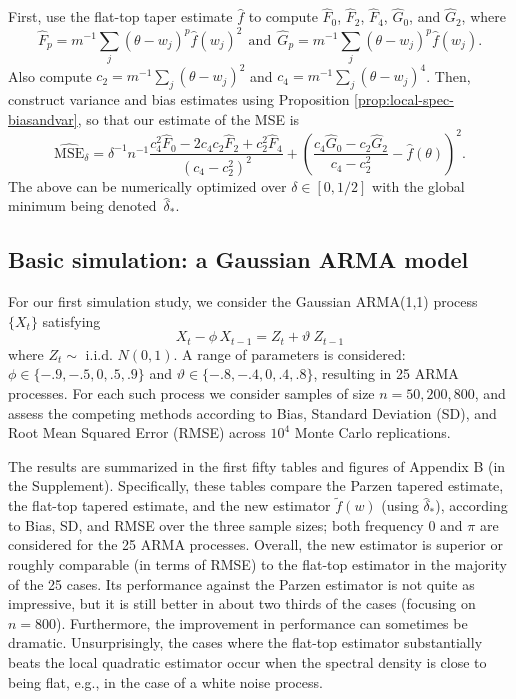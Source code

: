 \documentclass[12p E.Lt,psfig]{article} %
\begin{document}
   First,
      use the flat-top taper estimate $\widehat{f} $ to compute
      $\widehat{F}_0$, $\widehat{F}_2$, $\widehat{F}_4$, $\widehat{G}_0$, and $\widehat{G}_2$,
       where
\[
   \widehat{F}_p = m^{-1} \sum_j {(\theta - w_j)}^p {\widehat{f} (w_j)}^2  
\ \ \mbox{and} \ \ 
   \widehat{G}_p = m^{-1} \sum_j {(\theta - w_j)}^p \widehat{f} (w_j).
\]
  Also compute $c_2 = m^{-1} \sum_j  {(\theta - w_j) }^2$ and $c_4 = m^{-1} \sum_j  {(\theta - w_j) }^4$.
  Then, construct variance and bias estimates using Proposition \ref{prop:local-spec-biasandvar},
  so that our estimate of the MSE is
\[
  \widehat{\mbox{MSE}}_{\delta} =
      \delta^{-1}  n^{-1}   \frac{ c_4^2 \widehat{F}_0 - 2 c_4 c_2 \widehat{F}_2 + c_2^2 \widehat{F}_4 }{ {(c_4 - c_2^2)}^2 }
   +  { \left( \frac{ c_4 \widehat{G}_0 - c_2 \widehat{G}_2 }{ c_4 - c_2^2 } -  \widehat{f} (\theta)     \right) }^2.
\]
 The above %
can   be numerically optimized over $\delta \in [0, 1/2]$ with  the global minimum being  denoted~$\widehat{\delta}_*$.

\subsection{Basic simulation: a Gaussian ARMA model}  For our first simulation study, we consider the Gaussian ARMA(1,1) process $\{ X_t \}$  satisfying
\[
   X_{t} -\phi \, X_{t-1} =  Z_{t} +\vartheta  \ Z_{t-1}
\]
where $Z_t\sim$ i.i.d. $N(0,1)$.
 A range of parameters is considered: $\phi \in \{ -.9, -.5, 0, .5, .9 \}$ and $\vartheta \in \{ -.8, -.4, 0, .4, .8 \}$,
  resulting in 25  ARMA processes.    For each such process we consider samples of size $n = 50, 200, 800$,
   and assess the competing methods according to Bias, Standard Deviation (SD), and Root Mean Squared Error (RMSE)
 across $10^4$ Monte Carlo  replications.
 
   The results are summarized in the first fifty tables and figures
  of Appendix B (in the Supplement).  Specifically, these tables 
   compare the Parzen tapered estimate, the flat-top tapered estimate,
  and the new estimator   $\widetilde f(w)$
  (using  $\widehat{\delta}_*$),  according to Bias, SD, and RMSE  over the three sample sizes;
   both frequency $0$ and $\pi$ are considered for the 25 ARMA processes.  
       Overall, the new estimator is superior or roughly comparable (in terms of RMSE)
        to the flat-top estimator in the majority of
       the 25 cases. Its performance against the Parzen estimator is not quite as impressive, but it is still better        in about two thirds of the cases (focusing on $n=800$).  
         Furthermore, the improvement in performance  can sometimes be dramatic.
Unsurprisingly, the cases          where the flat-top estimator substantially beats the local quadratic estimator occur 
         when the spectral density is close to being flat, e.g., in the case of a white noise process.
         
\end{document}
